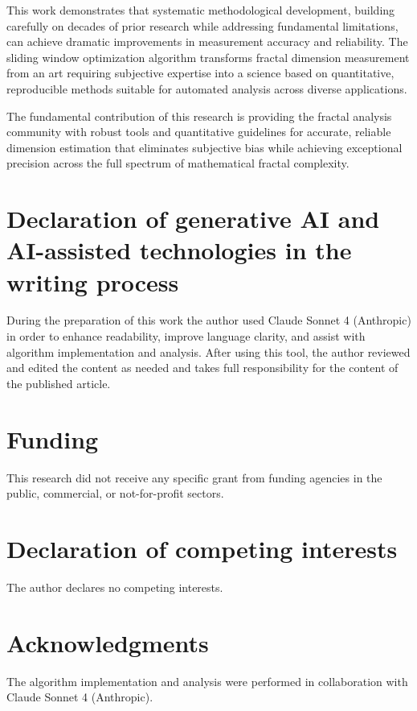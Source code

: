\documentclass[preprint,12pt]{elsarticle}
\begin{document}
This work demonstrates that systematic methodological development, building carefully on decades of prior research while addressing fundamental limitations, can achieve dramatic improvements in measurement accuracy and reliability. The sliding window optimization algorithm transforms fractal dimension measurement from an art requiring subjective expertise into a science based on quantitative, reproducible methods suitable for automated analysis across diverse applications.

The fundamental contribution of this research is providing the fractal analysis community with robust tools and quantitative guidelines for accurate, reliable dimension estimation that eliminates subjective bias while achieving exceptional precision across the full spectrum of mathematical fractal complexity.

\section*{Declaration of generative AI and AI-assisted technologies in the writing process}
During the preparation of this work the author used Claude Sonnet 4 (Anthropic) in order to enhance readability, improve language clarity, and assist with algorithm implementation and analysis. After using this tool, the author reviewed and edited the content as needed and takes full responsibility for the content of the published article.

\section*{Funding}
This research did not receive any specific grant from funding agencies in the public, commercial, or not-for-profit sectors.

\section*{Declaration of competing interests}
The author declares no competing interests.

\section*{Acknowledgments}
The algorithm implementation and analysis were performed in collaboration with Claude Sonnet 4 (Anthropic).

\appendix


\end{document}

